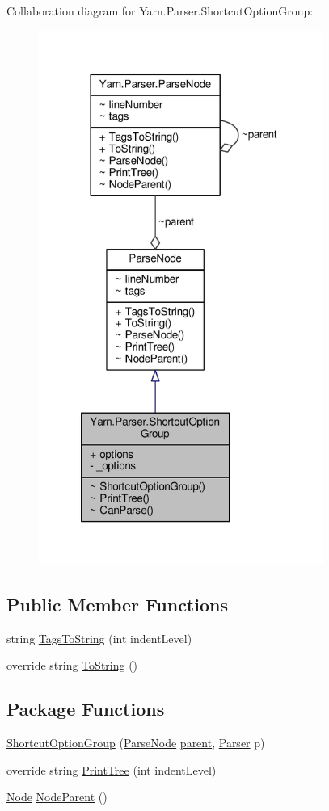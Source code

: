 Collaboration diagram for Yarn.\-Parser.\-Shortcut\-Option\-Group\-:
\nopagebreak
\begin{figure}[H]
\begin{center}
\leavevmode
\includegraphics[width=263pt]{a00704}
\end{center}
\end{figure}
\subsection*{Public Member Functions}
\begin{DoxyCompactItemize}
\item 
string \hyperlink{a00148_a054f36c80d5eeacd569a8859f599af67}{Tags\-To\-String} (int indent\-Level)
\item 
override string \hyperlink{a00148_a18c67cb16090d0889bb9d6c8c6c565f8}{To\-String} ()
\end{DoxyCompactItemize}
\subsection*{Package Functions}
\begin{DoxyCompactItemize}
\item 
\hyperlink{a00160_aa4ee47826640ad8dff651603c940c7f4}{Shortcut\-Option\-Group} (\hyperlink{a00148}{Parse\-Node} \hyperlink{a00148_af313a82103fcc2ff5a177dbb06b92f7b}{parent}, \hyperlink{a00149}{Parser} p)
\item 
override string \hyperlink{a00160_a7b60f85e46b8767db81177ec40e83104}{Print\-Tree} (int indent\-Level)
\item 
\hyperlink{a00138}{Node} \hyperlink{a00148_a580e520a29444fc23ac3660cbe514a09}{Node\-Parent} ()
\end{DoxyCompactItemize}

